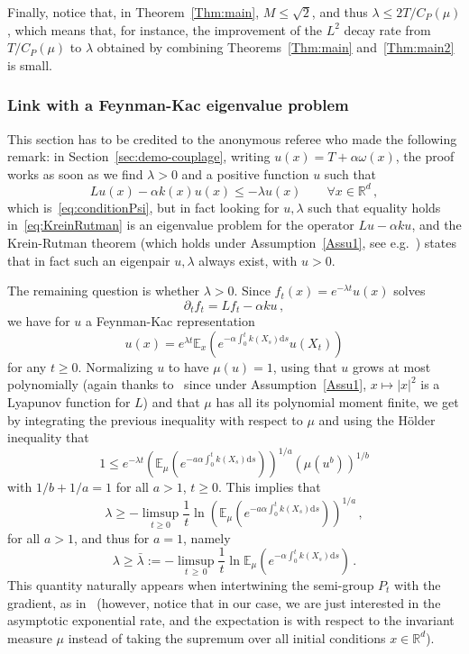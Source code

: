 \documentclass[10pt]{amsart}
\theoremstyle{definition}\newtheorem{defi}[theo]{Definition}\newtheorem{rema}[theo]{Remark}\newtheorem{exam}[theo]{Example}\newtheorem{exem}[theo]{Example}\newtheorem{nota}[theo]{Notation}
\newcommand{\R}{\mathbb R}
\newcommand{\bbE}{\mathbb E}
\newcommand{\dd}{\mathrm{d}}
\newcommand{\1}{\mathbbm{1}}
\newcommand{\nv}[1]{#1}
\let\oldforall\forall
\renewcommand*{\forall}{\mathrel{\oldforall}}
\begin{document}
Finally, notice that, in Theorem~\ref{Thm:main}, $M\leqslant \sqrt{2}$, and thus $\lambda\leqslant 2 T/C_P(\mu)$, which means that, for instance, the improvement of the $L^2$ decay rate from $T/C_P(\mu)$ to $\lambda$ obtained by \nv{combining} Theorems~\ref{Thm:main} and~\ref{Thm:main2} is small.

\subsubsection*{Link with a Feynman-Kac eigenvalue problem} 

This section has to be credited to the anonymous referee who made the following remark: in Section~\ref{sec:demo-couplage}, writing $u(x) = T+\alpha \omega(x)$, the proof works as soon as we find $\lambda>0$ and a positive function $u$ such that
\begin{equation}\label{eq:KreinRutman}
Lu(x) - \alpha k(x) u(x) \leqslant - \lambda u(x)\qquad \forall x\in\R^d\,,
\end{equation}
which is~\eqref{eq:conditionPsi}, but in fact looking for $u,\lambda$ such that equality holds in~\eqref{eq:KreinRutman} is an eigenvalue problem for the operator $Lu-\alpha ku$, and the Krein-Rutman theorem (which holds under Assumption~\ref{Assu1}, see e.g.~\cite[Corollary~4.2]{champagnat2023general}) states that in fact such an eigenpair $u,\lambda$ always exist, with $u>0$.

The remaining question is whether $\lambda >0$. Since $f_t(x) = e^{-\lambda t} u(x)$ solves
\[
\partial_t f_t = Lf_t - \alpha k u\,,
\]
we have for $u$ a Feynman-Kac representation
\[
u(x) = e^{\lambda t} \bbE_x \left( e^{-\alpha \int_0^t k(X_s)\dd s} u(X_t) \right)
\]
for any $t\geqslant 0$. Normalizing $u$ to have $\mu(u) = 1$, using that $u$ grows at most polynomially (again thanks to~\cite[Corollary~4.2]{champagnat2023general} since under Assumption~\ref{Assu1}, $x\mapsto |x|^2$ is a Lyapunov function for $L$) and that $\mu$ has all its polynomial moment finite, we get by integrating the previous inequality with respect to $\mu$ and using the Hölder inequality that
\[
1 \leqslant e^{-\lambda t} \left( \bbE_{\mu} \left( e^{- a \alpha \int_0^t k(X_s)\dd s} \right)\right)^{1/a} \left( \mu(u^{b})\right)^{1/b}
\]
with $1/b+1/a=1$ for all $a>1$, $t\geqslant 0$. This implies that
\[
\lambda \geqslant - \limsup_{t\geqslant 0} \frac{1}{t}\ln \left( \bbE_{\mu} \left( e^{- a\alpha \int_0^t k(X_s)\dd s} \right)\right)^{1/a}\,,
\]
for all $a>1$, and thus for $a=1$, namely
\[
\lambda \geqslant \bar\lambda := - \limsup_{t\,\geqslant\,0} \frac{1}{t}\ln \bbE_{\mu} \left( e^{- \alpha \int_0^t k(X_s)\dd s} \right)\,.
\]
This quantity naturally appears when intertwining the semi-group $P_t$ with the gradient, as in~\cite{arnaudon2018intertwinings,CattiauxGuillinFathi,10.3150/12-BEJ433} (however, notice that in our case, we are just interested in the asymptotic exponential rate, and the expectation is with respect to the invariant measure $\mu$ instead of taking the supremum over all initial conditions $x\in\R^d$).
\end{document}
